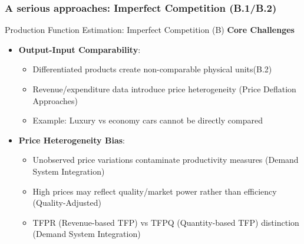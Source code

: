 \documentclass[aspectratio=169]{beamer}  %
\begin{document}
\subsubsection{A serious approaches: Imperfect Competition (B.1/B.2)}
\begin{frame}{Production Function Estimation: Imperfect Competition (B)}
\textbf{Core Challenges}
\begin{itemize}
    \item \textbf{Output-Input Comparability}:
    \begin{itemize}
        \item Differentiated products create non-comparable physical units(B.2)
        \item Revenue/expenditure data introduce price heterogeneity (Price Deflation Approaches)
        \item Example: Luxury vs economy cars cannot be directly compared
    \end{itemize}
    
    \item \textbf{Price Heterogeneity Bias}:
    \begin{itemize}
        \item Unobserved price variations contaminate productivity measures (Demand System Integration)
        \item High prices may reflect quality/market power rather than efficiency (Quality-Adjusted)
        \item TFPR (Revenue-based TFP) vs TFPQ (Quantity-based TFP) distinction (Demand System Integration)
    \end{itemize}
\end{itemize}

\end{frame}


    
\end{document}
